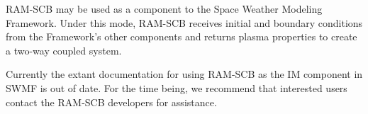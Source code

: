 RAM-SCB may be used as a component to the Space Weather Modeling Framework. Under this mode, RAM-SCB receives initial and boundary conditions from the Framework's other components and returns plasma properties to create a two-way coupled system.

Currently the extant documentation for using RAM-SCB as the IM component in SWMF is out of date. For the time being, we recommend that interested users contact the RAM-SCB developers for assistance.


 




